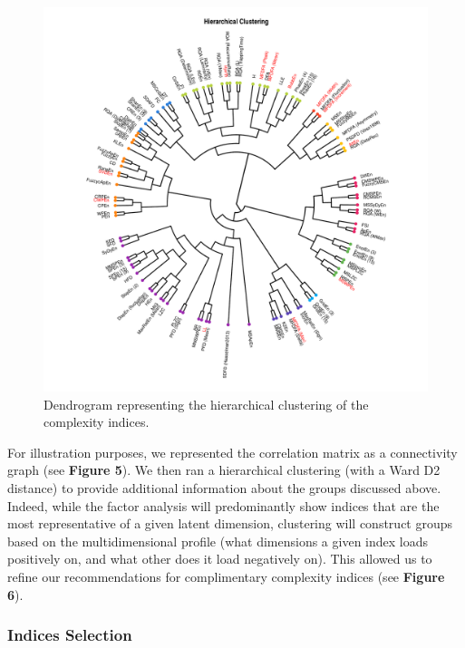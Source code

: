 \documentclass[
  man]{apa6}
\begin{document}
\begin{figure}
\centering
\includegraphics{./figures/clustering-1.pdf}
\caption{\label{fig:clustering}Dendrogram representing the hierarchical clustering of the complexity indices.}
\end{figure}

For illustration purposes, we represented the correlation matrix as a connectivity graph (see \textbf{Figure 5}). We then ran a hierarchical clustering (with a Ward D2 distance) to provide additional information about the groups discussed above. Indeed, while the factor analysis will predominantly show indices that are the most representative of a given latent dimension, clustering will construct groups based on the multidimensional profile (what dimensions a given index loads positively on, and what other does it load negatively on). This allowed us to refine our recommendations for complimentary complexity indices (see \textbf{Figure 6}).

\hypertarget{indices-selection}{%
\subsubsection{Indices Selection}\label{indices-selection}}
\end{document}
